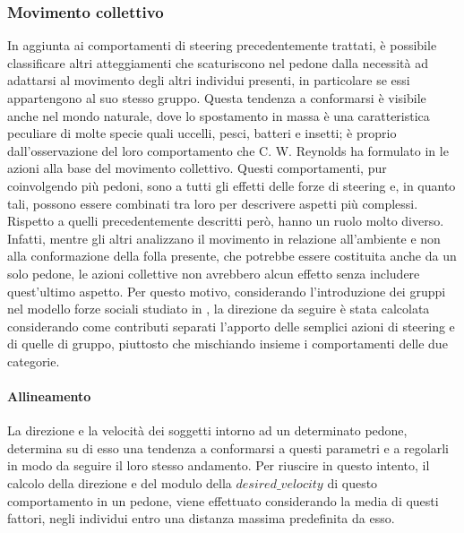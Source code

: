 \subsubsection{Movimento collettivo}
In aggiunta ai comportamenti di steering precedentemente trattati, è possibile classificare altri atteggiamenti che scaturiscono nel pedone dalla necessità ad adattarsi al movimento degli altri individui presenti, in particolare se essi appartengono al suo stesso gruppo. \newline
Questa tendenza a conformarsi è visibile anche nel mondo naturale, dove lo spostamento in massa è una caratteristica peculiare di molte specie quali uccelli, pesci, batteri e insetti; è proprio dall'osservazione del loro comportamento che C. W. Reynolds ha formulato in \cite{Reynolds1987} le azioni alla base del movimento collettivo. \newline
Questi comportamenti, pur coinvolgendo più pedoni, sono a tutti gli effetti delle forze di steering e, in quanto tali, possono essere combinati tra loro per descrivere aspetti più complessi. Rispetto a quelli precedentemente descritti però, hanno un ruolo molto diverso. Infatti, mentre gli altri analizzano il movimento in relazione all'ambiente e non alla conformazione della folla presente, che potrebbe essere costituita anche da un solo pedone, le azioni collettive non avrebbero alcun effetto senza includere quest'ultimo aspetto. \newline
Per questo motivo, considerando l'introduzione dei gruppi nel modello forze sociali studiato in \cite{Moussad2010}, la direzione da seguire è stata calcolata considerando come contributi separati l'apporto delle semplici azioni di steering e di quelle di gruppo, piuttosto che mischiando insieme i comportamenti delle due categorie.

\paragraph{Allineamento}
La direzione e la velocità dei soggetti intorno ad un determinato pedone, determina su di esso una tendenza a conformarsi a questi parametri e a regolarli in modo da seguire il loro stesso andamento. Per riuscire in questo intento, il calcolo della direzione e del modulo della $desired\_velocity$ di questo comportamento in un pedone, viene effettuato considerando la media di questi fattori, negli individui entro una distanza massima predefinita da esso.

